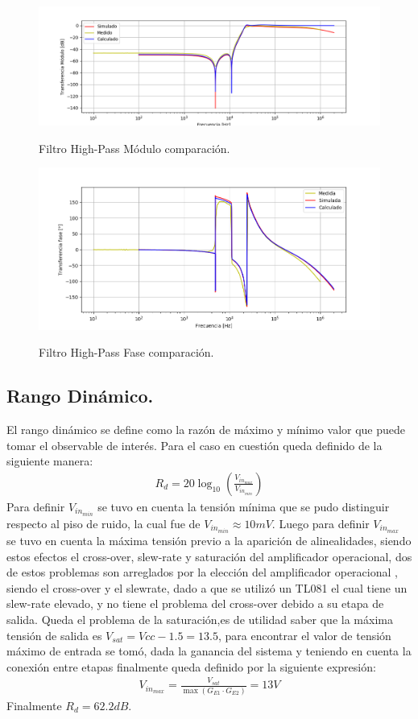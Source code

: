 \begin{figure}[H]
	\centering
	\includegraphics[width=\textwidth]{Imagenes-Ej3/BodeMedCalcSim.png}
	\label{fig:BodeSedraComp}
	\caption{Filtro High-Pass Módulo comparación.}
\end{figure}
\begin{figure}[H]
	\centering
	\includegraphics[width=\textwidth]{Imagenes-Ej3/BodeMedCalcSimFase.png}
	\label{fig:FaseBodeSedraComp}
	\caption{Filtro High-Pass Fase comparación.}
\end{figure}
\subsection{Rango Dinámico.}
El rango dinámico se define como la razón de máximo y mínimo valor que puede tomar el observable de interés. Para el caso en cuestión queda definido de la siguiente manera:
\begin{align}
R_d = 20 \log_{10} \left( \frac{V_{in_{max}}}{V_{in_{min}}} \right)
\end{align}
Para definir $V_{in_{min}}$ se tuvo en cuenta la tensión mínima que se pudo distinguir respecto al piso de ruido, la cual fue de $V_{in_{min}} \approx 10mV$. Luego para definir $V_{in_{max}}$ se tuvo en cuenta la máxima tensión previo a la aparición de alinealidades, siendo estos efectos el cross-over, slew-rate y saturación del amplificador operacional, dos de estos problemas son arreglados por la elección del amplificador operacional , siendo el cross-over y el slewrate, dado a que se utilizó un TL081 el cual tiene un slew-rate elevado, y no tiene el problema del cross-over debido a su etapa de salida. Queda el problema de la saturación,es de utilidad saber que la máxima tensión de salida es $V_{sat} = Vcc-1.5 =13.5$, para encontrar el valor de tensión máximo de entrada se tomó, dada la ganancia del sistema y teniendo en cuenta la conexión entre etapas finalmente queda definido por la siguiente expresión:
\begin{align}
V_{in_{max}}=\frac{V_{sat}}{  \max(G_{E1} \cdot G_{E2} )} = 13V
\end{align}
Finalmente $R_d = 62.2dB$.

